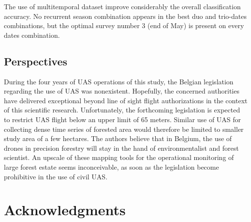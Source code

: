 \documentclass[remotesensing,article,submit,moreauthors,pdftex,12pt,a4paper]{mdpi} %
\begin{document}
The use of multitemporal dataset improve considerably the overall classification accuracy. 
No recurrent season combination appears in the best duo and trio-dates combinations, but the optimal survey number 3 (end of May) is present on every dates combination.






\subsection{Perspectives}

During the four years of UAS operations of this study, the Belgian legislation regarding the use of UAS was nonexistent. 
Hopefully, the concerned authorities have delivered exceptional beyond line of sight flight authorizations in the context of this scientific research. 
Unfortunately, the forthcoming legislation is expected to restrict UAS flight below an upper limit of 65 meters. 
Similar use of UAS for collecting dense time series of forested area would therefore be limited to smaller study area of a few hectares. 
The authors believe that in Belgium, the use of drones in precision forestry will stay in the hand of environmentalist and forest scientist. 
An upscale of these mapping tools for the operational monitoring of large forest estate seems inconceivable, as soon as the legislation become prohibitive in the use of civil UAS. 

\section*{\noindent Acknowledgments}
\vspace{12pt}
\end{document}
